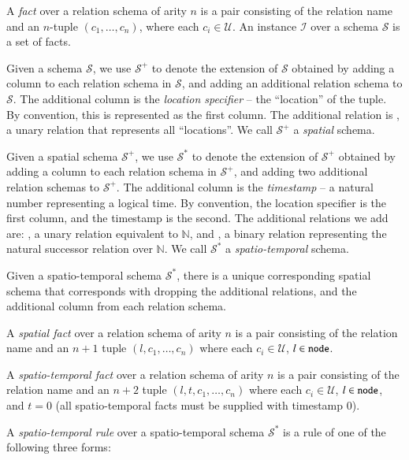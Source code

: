 
A {\em fact} over a relation schema of arity $n$ is a pair consisting of the relation name and an $n$-tuple $(c_1,\ldots,c_n)$, where each $c_i \in \mathcal{U}$.  An instance $\mathcal{I}$ over a schema $\mathcal{S}$ is a set of facts.

Given a schema $\mathcal{S}$, we use $\mathcal{S}^+$ to denote the extension of $\mathcal{S}$ obtained by adding a column to each relation schema in $\mathcal{S}$, and adding an additional relation schema to $\mathcal{S}$.  The additional column is the {\em location specifier} -- the ``location'' of the tuple.  By convention, this is represented as the first column.  The additional relation is , a unary relation that represents all ``locations''.  We call $\mathcal{S}^+$ a {\em spatial} schema.

Given a spatial schema $\mathcal{S}^+$, we use $\mathcal{S}^*$ to denote the extension of $\mathcal{S}^+$ obtained by adding a column to each relation schema in $\mathcal{S}^+$, and adding two additional relation schemas to $\mathcal{S}^+$.  The additional column is the {\em timestamp} -- a natural number representing a logical time.  By convention, the location specifier is the first column, and the timestamp is the second.  The additional relations we add are: , a unary relation equivalent to $\mathbb{N}$, and , a binary relation representing the natural successor relation over $\mathbb{N}$.  We call $\mathcal{S}^*$ a {\em spatio-temporal} schema.

Given a spatio-temporal schema $\mathcal{S}^*$, there is a unique corresponding spatial schema that corresponds with dropping the additional relations, and the additional column from each relation schema.

A {\em spatial fact} over a relation schema of arity $n$ is a pair consisting of the relation name and an $n+1$ tuple $(l,c_1,\ldots,c_n)$ where each $c_i \in \mathcal{U}$, $l \in \dedalus{node}$.

A {\em spatio-temporal fact} over a relation schema of arity $n$ is a pair consisting of the relation name and an $n+2$ tuple $(l,t,c_1,\ldots,c_n)$ where each $c_i \in \mathcal{U}$, $l \in \dedalus{node}$, and $t = 0$ (all spatio-temporal facts must be supplied with timestamp 0).

A {\em spatio-temporal rule} over a spatio-temporal schema $\mathcal{S}^*$ is a rule of one of the following three forms:

